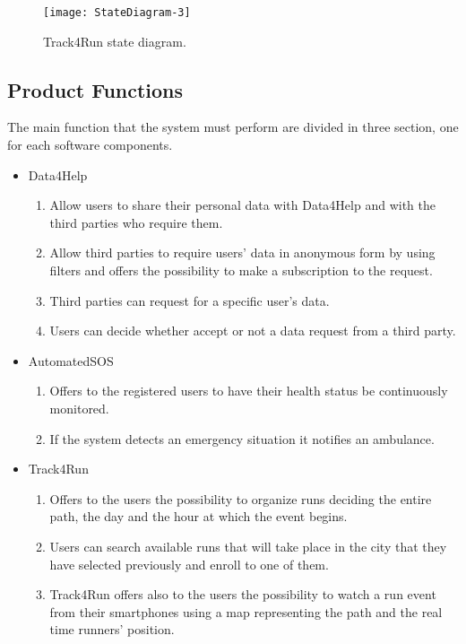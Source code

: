 \documentclass[a4paper]{article}
\begin{document}
\vspace{0.5cm}

\begin{figure}[H]
    \centering
    \texttt{[image: StateDiagram-3]}
    \caption{Track4Run state diagram.}
    \label{fig:my_label}
\end{figure}

\clearpage

\subsection{Product Functions}
The main function that the system must perform are divided in three section, one for each software components.
\begin{itemize}
    \item Data4Help
    \begin{enumerate}
        \item Allow users to share their personal data with Data4Help and with the third parties who require them.
        \item Allow third parties to require users' data in anonymous form by using filters and offers the possibility to make a subscription to the request.
        \item Third parties can request for a specific user's data.
        \item Users can decide whether accept or not a data request from a third party.
    \end{enumerate}
    \item AutomatedSOS
    \begin{enumerate}
        \item Offers to the registered users to have their health status be continuously monitored.
        \item If the system detects an emergency situation it notifies an ambulance.
    \end{enumerate}
    \item Track4Run
    \begin{enumerate}
        \item Offers to the users the possibility to organize runs deciding the entire path, the day and the hour at which the event begins.
        \item Users can search available runs that will take place in the city that they have selected previously and enroll to one of them.
        \item Track4Run offers also to the users the possibility to watch a run event from their smartphones using a map representing the path and the real time runners' position.
    \end{enumerate}
\end{itemize}
\clearpage
\end{document}
